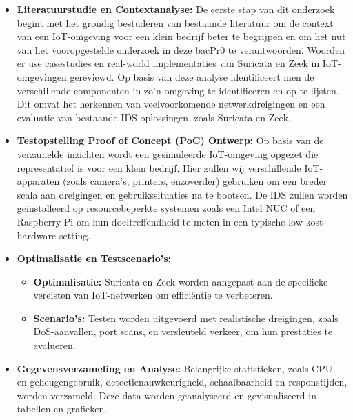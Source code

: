 \begin{itemize}
    \item \textbf{Literatuurstudie en Contextanalyse:} De eerste stap van dit onderzoek begint met het grondig bestuderen van bestaande literatuur om de context van een IoT-omgeving voor een klein bedrijf beter te begrijpen en om het nut van het vooropgestelde onderzoek in deze bacPr0 te verantwoorden. Woorden er use casestudies en real-world implementaties van Suricata en Zeek in IoT-omgevingen gereviewd. Op basis van deze analyse identificeert men de verschillende componenten in zo’n omgeving te identificeren en op te lijsten. Dit omvat het herkennen van veelvoorkomende netwerkdreigingen en een evaluatie van bestaande IDS-oplossingen, zoals Suricata en Zeek.
    
    \item \textbf{Testopstelling Proof of Concept (PoC) Ontwerp:} Op basis van de verzamelde inzichten wordt een gesimuleerde IoT-omgeving opgezet die representatief is voor een klein bedrijf. Hier zullen wij verschillende IoT-apparaten (zoals camera’s, printers, enzoverder) gebruiken om een breder scala aan dreigingen en gebruikssituaties na te bootsen. De IDS zullen worden geïnstalleerd op resourcebeperkte systemen zoals een Intel NUC of een Raspberry Pi om hun doeltreffendheid te meten in een typische low-kost hardware setting.
    
    \item \textbf{Optimalisatie en Testscenario’s:} 
    \begin{itemize}
        \item \textbf{Optimalisatie:} Suricata en Zeek worden aangepast aan de specifieke vereisten van IoT-netwerken om efficiëntie te verbeteren.
        \item \textbf{Scenario’s:} Testen worden uitgevoerd met realistische dreigingen, zoals DoS-aanvallen, port scans, en versleuteld verkeer, om hun prestaties te evalueren.
    \end{itemize}
    
    \item \textbf{Gegevensverzameling en Analyse:} Belangrijke statistieken, zoals CPU- en geheugengebruik, detectienauwkeurigheid, schaalbaarheid en responstijden, worden verzameld. Deze data worden geanalyseerd en gevisualiseerd in tabellen en grafieken.
    

\end{itemize}
